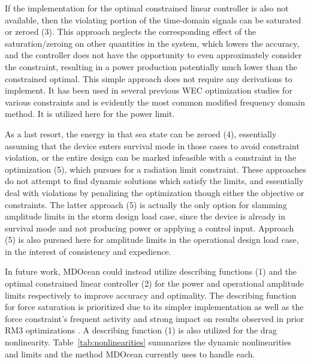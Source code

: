 If the implementation for the optimal constrained linear controller is also not available, then the violating portion of the time-domain signals can be saturated or zeroed (3).
This approach neglects the corresponding effect of the saturation/zeroing on other quantities in the system, which lowers the accuracy, and the controller does not have the opportunity to even approximately consider the constraint, resulting in a power production potentially much lower than the constrained optimal.
This simple approach does not require any derivations to implement.
It has been used in several previous WEC optimization studies for various constraints \cite{garcia-teruel_design_2022,garcia-teruel_reliability-based_2021,cotten_multi-objective_2022,mccabe_constrained_2013} and is evidently the most common modified frequency domain method.
It is utilized here for the power limit.

As a last resort, the energy in that sea state can be zeroed (4), essentially assuming that the device enters survival mode in those cases to avoid constraint violation, or the entire design can be marked infeasible with a constraint in the optimization (5), which \cite{mccabe_constrained_2013} pursues for a radiation limit constraint.
These approaches do not attempt to find dynamic solutions which satisfy the limits, and essentially deal with violations by penalizing the optimization though either the objective or constraints.
The latter approach (5) is actually the only option for slamming amplitude limits in the storm design load case, since the device is already in survival mode and not producing power or applying a control input.
Approach (5) is also pursued here for amplitude limits in the operational design load case, in the interest of consistency and expedience. 

In future work, MDOcean could instead utilize describing functions (1) and the optimal constrained linear controller (2) for the power and operational amplitude limits respectively to improve accuracy and optimality.
The describing function for force saturation is prioritized due to its simpler implementation as well as the force constraint's frequent activity and strong impact on results observed in prior RM3 optimizations \cite{mccabe_multidisciplinary_2022,gaebele_tpl_2025,mcgilton_optimal_2024}.
A describing function (1) is also utilized for the drag nonlinearity.
Table~\ref{tab:nonlinearities} summarizes the dynamic nonlinearities and limits and the method MDOcean currently uses to handle each.


